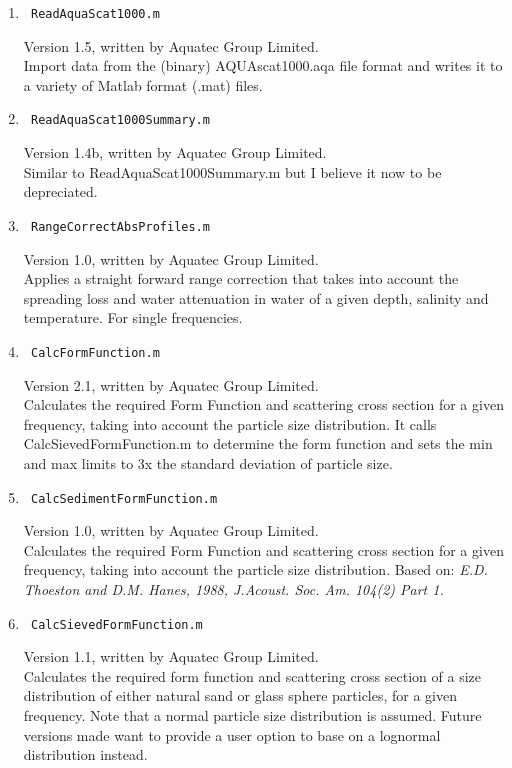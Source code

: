 \documentclass[a4paper,10pt]{report}
\begin{document}
\begin{enumerate}
 \item 
\begin{verbatim} ReadAquaScat1000.m \end{verbatim}
Version 1.5, written by Aquatec Group Limited.\\
Import data from the (binary) AQUAscat1000.aqa file format and writes it to a variety of Matlab format (.mat) files.

 \item
\begin{verbatim} ReadAquaScat1000Summary.m \end{verbatim}
Version 1.4b, written by Aquatec Group Limited.\\
Similar to ReadAquaScat1000Summary.m but I believe it now to be depreciated.

 \item
\begin{verbatim} RangeCorrectAbsProfiles.m \end{verbatim}
Version 1.0, written by Aquatec Group Limited.\\
Applies a straight forward range correction that takes into account the spreading loss and water attenuation in water of a given depth, salinity and temperature. For single frequencies.

 \item
\begin{verbatim} CalcFormFunction.m \end{verbatim}
Version 2.1, written by Aquatec Group Limited.\\
Calculates the required Form Function and scattering cross section for a given frequency, taking into account the particle size distribution. It calls CalcSievedFormFunction.m to determine the form function and sets the min and max limits to 3x the standard deviation of particle size. 

 \item
\begin{verbatim} CalcSedimentFormFunction.m \end{verbatim}
Version 1.0, written by Aquatec Group Limited.\\
Calculates the required Form Function and scattering cross section for a given frequency, taking into account the particle size distribution. Based on: \textit{E.D. Thoeston and D.M. Hanes, 1988, J.Acoust. Soc. Am. 104(2) Part 1.}

 \item
\begin{verbatim} CalcSievedFormFunction.m \end{verbatim}
Version 1.1, written by Aquatec Group Limited.\\
Calculates the required form function and scattering cross section of a size distribution of either natural sand or glass sphere particles, for a given frequency. Note that a normal particle size distribution is assumed. Future versions made want to provide a user option to base on a lognormal distribution instead.


\end{enumerate}
\end{document}

